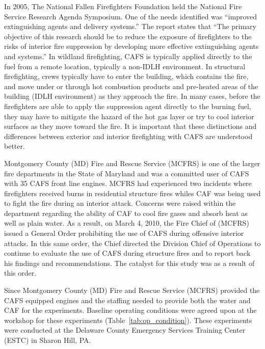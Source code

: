 \documentclass[12pt,oneside]{book}
\begin{document}
In 2005, The National Fallen Firefighters Foundation held the National Fire Service Research Agenda Symposium.  One of the needs identified was ``improved extinguishing agents and delivery systems.'' The report states that ``The primary objective of this research should be to reduce the exposure of firefighters to the risks of interior fire suppression by developing more effective extinguishing agents and systems.'' In wildland firefighting, CAFS is typically applied directly to the fuel from a remote location, typically a non-IDLH environment. In structural firefighting, crews typically  have to enter the building, which contains the fire, and move under or through hot combustion products and pre-heated areas of the building (IDLH environment) as they approach the fire. In many cases, before the firefighters are able to apply the suppression agent directly to the burning fuel, they may have to mitigate the hazard of the hot gas layer or try to cool interior surfaces as they move toward the fire. It is important that these distinctions and differences between exterior and interior firefighting with CAFS are understood better.

Montgomery County (MD) Fire and Rescue Service (MCFRS) is one of the larger fire departments in the State of Maryland and was a committed user of CAFS with 35 CAFS front line engines. MCFRS had experienced two incidents where firefighters received burns in residential structure fires whiles CAF was being used to fight the fire during an interior attack. Concerns were raised within the department regarding the ability of CAF to cool fire gases and absorb heat as well as plain water. As a result, on March 4, 2010, the Fire Chief of (MCFRS) issued a General Order prohibiting the use of CAFS during offensive interior attacks. In this same order, the Chief directed the Division Chief of Operations to continue to evaluate the use of CAFS during structure fires and to report back his findings and recommendations. The catalyst for this study was as a result of this order.

Since Montgomery County (MD) Fire and Rescue Service (MCFRS) provided the CAFS equipped engines and the staffing needed to provide both the water and CAF for the experiments. Baseline operating conditions were agreed upon at the workshop for these experiments (Table~\ref{tab:op_condition}). These experiments were conducted at the Delaware County Emergency Services Training Center (ESTC) in Sharon Hill, PA.
\end{document}
